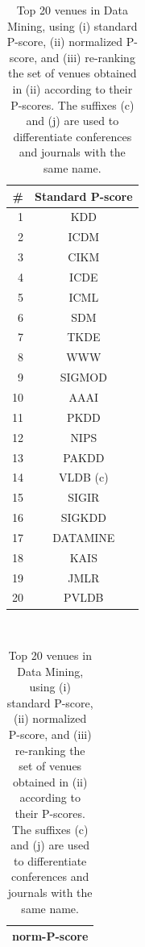 \begin{table}[htbp]
\centering
\caption{Top 20 venues in Data Mining, using (i) standard P-score, (ii) normalized P-score, and (iii) re-ranking the set of venues obtained in (ii) according to their P-scores. The suffixes (c) and (j) are used to differentiate conferences and journals with the same name.}
\label{tab:dm-venues}
\begin{tabular}{rc}
\toprule
\#		&	Standard P-score \\ 
\midrule
1		&		KDD			\\
2		&		ICDM		\\
3		&		CIKM		\\
4		&		ICDE		\\
5		&		ICML		\\
6		&		SDM			\\
7		&		TKDE		\\
8		&		WWW			\\
9		&		SIGMOD		\\
10		&		AAAI		\\
11		&		PKDD		\\
12		&		NIPS		\\
13		&		PAKDD		\\
14		&		VLDB (c)	\\
15		&		SIGIR		\\
16		&		SIGKDD		\\
17		&		DATAMINE	\\
18		&		KAIS		\\
19		&		JMLR		\\
20		&		PVLDB		\\
\bottomrule
\end{tabular} \ \ 
\begin{tabular}{c}
\toprule
norm-P-score \\ 
\midrule

\end{tabular}
\end{table}
